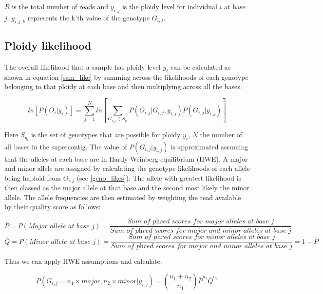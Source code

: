 \documentclass[11pt]{article}
\begin{document}
$R$ is the total number of reads and $y_{i,j}$ is the ploidy level for individual $i$ at base $j$. $g_{i,j,k}$ represents the k'th value of the genotype $G_{i,j}$.
\subsection{Ploidy likelihood}
\paragraph{}The overall likelihood that a sample has ploidy level $y_{i}$ can be calculated as shown in equation \ref{sam_like} by summing across the likelihoods of each genotype belonging to that ploidy at each base and then multiplying across all the bases.

\begin{equation}\label{sam_like}
ln[P(O_{i}|y_{i})]=\sum_{j=1}^{N}ln[\sum_{G_{i,j} \in S_{y_{i} }} P(O_{i,j}|G_{i,j},y_{i,j})P(G_{i,j}|y_{i,j})]
\end{equation}

Here $S_{y_{i} }$ is the set of genotypes that are possible for ploidy $y_{i}$, $N$ the number of all bases in the supercontig. The value of $P(G_{i,j}|y_{i,j})$ is approximated assuming that the alleles at each base are in Hardy-Weinberg equilibrium (HWE). A major and minor allele are assigned by calculating the genotype likelihoods of each allele being haploid from $O_{i,j}$ (see \ref{geno_likes}). The allele with greatest likelihood is then classed as the major allele at that base and the second most likely the minor allele. The allele frequencies are then estimated by weighting the read available by their quality score as follows:

\begin{equation*}
\bar{P}=P(\textit{Major allele at base j})=\frac{ \textit{Sum of phred scores for major alleles at base j} }{\textit{Sum of phred scores for major and minor alleles at base j} }
\end{equation*}
\begin{equation*}
\bar{Q}=P(\textit{Minor allele at base j})=\frac{\textit{Sum of phred scores for minor alleles at base j} }{\textit{Sum of phred scores for major and minor alleles at base j} } =1-\bar{P}
\end{equation*}

Thus we can apply HWE assumptions and calculate:

\begin{equation}
P(G_{i,j}=n_{1}\times\textit{major},n_{2}\times\textit{minor}|y_{i,j})=\binom{n_{1} + n_{2} }{n_{1} } \bar{P}^{n_1} \bar{Q}^{n_2} 
\end{equation}
\end{document}
